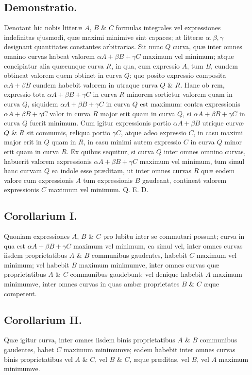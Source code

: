 \subsection*{Demonstratio.}
Denotant hic nobis litteræ $A$, $B$ \& $C$ formulas integrales vel expressiones indefinitas ejusmodi, quæ maximi minimive sint capaces; at litteræ $\alpha,\beta,\gamma$ designant quantitates constantes arbitrarias. Sit nunc $Q$ curva, quæ inter omnes omnino curvas habeat valorem $\alpha A+\beta B+\gamma C$ maximum vel minimum; atque concipiatur alia quæcunque curva $R$, in qua, cum expressio $A$, tum $B$, eundem obtineat valorem quem obtinet in curva $Q$; quo posito expressio composita $\alpha A+\beta B$ eundem habebit valorem in utraque curva $Q$ \& $R$. Hanc ob rem, expressio tota $\alpha A+\beta B+\gamma C$ in curva $R$ minorem sortietur valorem quam in curva $Q$, siquidem $\alpha A+\beta B+\gamma C$ in curva $Q$ est maximum: contra expressionis $\alpha A+\beta B+\gamma C$ valor in curva $R$ major erit quam in curva $Q$, si $\alpha A+\beta B+\gamma C$ in curva $Q$ fuerit minimum. Cum igitur expressionis portio $\alpha A+\beta B$ utrique curvæ $Q$ \& $R$ sit communis, reliqua portio $\gamma C$, atque adeo expressio $C$, in casu maximi major erit in $Q$ quam in $R$, in casu minimi autem expressio $C$ in curva $Q$ minor erit quam in curva $R$. Ex quibus sequitur, si curva $Q$ inter omnes omnino curvas, habuerit valorem expressionis $\alpha A+\beta B+\gamma C$ maximum vel minimum, tum simul hanc curvam $Q$ ea indole esse præditam, ut inter omnes curvas $R$ quæ eodem valore cum expressionis $A$ tum expressionis $B$ gaudeant, contineat valorem expressionis $C$ maximum vel minimum. Q. E. D.
\subsection*{Corollarium I.}
Quoniam expressiones $A$, $B$ \& $C$ pro lubitu inter se commutari possunt; curva in qua est $\alpha A+\beta B+\gamma C$ maximum vel minimum, ea simul vel, inter omnes curvas iisdem proprietatibus $A$ \& $B$ communibus gaudentes, habebit $C$ maximum vel minimum; vel habebit $B$ maximum minimumve, inter omnes curvas quæ proprietatibus $A$ \& $C$ communibus gaudebunt; vel denique habebit $A$ maximum minimumve, inter omnes curvas in quas ambæ proprietates $B$ \& $C$ æque competent.
\subsection*{Corollarium II.}
Quæ igitur curva, inter omnes iisdem binis proprietatibus $A$ \& $B$ communibus gaudentes, habet $C$ maximum minimumve; eadem habebit inter omnes curvas binis proprietatibus vel $A$ \& $C$, vel $B$ \& $C$, æque præditas, vel $B$, vel $A$ maximum minimumve.
